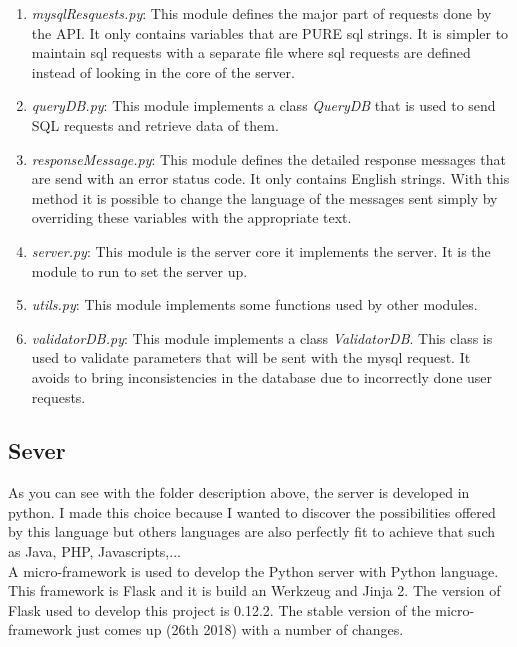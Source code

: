 \begin{enumerate}
\item \textit{mysqlResquests.py}: This module defines the major part of requests done by the API. It only contains variables that are PURE sql strings. It is simpler to maintain sql requests with a separate file where sql requests are defined instead of looking in the core of the server.
\item \textit{queryDB.py}: This module implements a class \textit{QueryDB} that is used to send SQL requests and retrieve data of them.
\item \textit{responseMessage.py}: This module defines the detailed response messages that are send with an error status code. It only contains English strings. With this method it is possible to change the language of the messages sent simply by overriding these variables with the appropriate text.
\item \textit{server.py}: This module is the server core it implements the server. It is the module to run to set the server up.
\item \textit{utils.py}: This module implements some functions used by other modules. 
\item \textit{validatorDB.py}: This module implements a class \textit{ValidatorDB}. This class is used to validate parameters that will be sent with the mysql request. It avoids to bring inconsistencies in the database due to incorrectly done user requests.
\end{enumerate}
\subsection{Sever}
As you can see with the folder description above, the server is developed in python. I made this choice because I wanted to discover the possibilities offered by this language but others languages are also perfectly fit to achieve that such as Java, PHP, Javascripts,...\\

A micro-framework is used to develop the Python server with Python language. This framework is Flask and it is build an Werkzeug and Jinja 2. The version of Flask used to develop this project is 0.12.2. The stable version of the micro-framework just comes up (26th 2018) with a number of changes. \\

